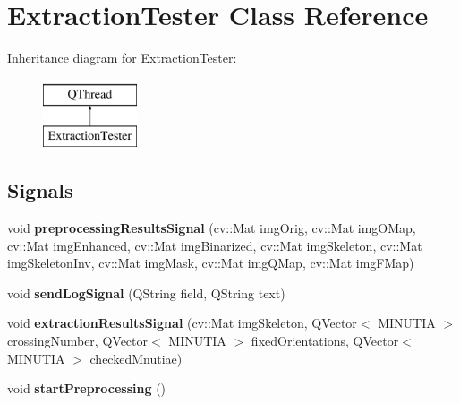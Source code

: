\hypertarget{class_extraction_tester}{}\section{Extraction\+Tester Class Reference}
\label{class_extraction_tester}
Inheritance diagram for Extraction\+Tester\+:\begin{figure}[H]
\begin{center}
\leavevmode
\includegraphics[height=2.000000cm]{class_extraction_tester}
\end{center}
\end{figure}
\subsection*{Signals}
\begin{DoxyCompactItemize}
\item 
\mbox{\label{class_extraction_tester_a7487d66988f68132722c3011ff06bdea}} 
void {\bfseries preprocessing\+Results\+Signal} (cv\+::\+Mat img\+Orig, cv\+::\+Mat img\+O\+Map, cv\+::\+Mat img\+Enhanced, cv\+::\+Mat img\+Binarized, cv\+::\+Mat img\+Skeleton, cv\+::\+Mat img\+Skeleton\+Inv, cv\+::\+Mat img\+Mask, cv\+::\+Mat img\+Q\+Map, cv\+::\+Mat img\+F\+Map)
\item 
\mbox{\label{class_extraction_tester_a8ef95fe9c357a88a10fb899471e48fcb}} 
void {\bfseries send\+Log\+Signal} (Q\+String field, Q\+String text)
\item 
\mbox{\label{class_extraction_tester_afa8a7e9e05078f0513377312828d95b8}} 
void {\bfseries extraction\+Results\+Signal} (cv\+::\+Mat img\+Skeleton, Q\+Vector$<$ M\+I\+N\+U\+T\+IA $>$ crossing\+Number, Q\+Vector$<$ M\+I\+N\+U\+T\+IA $>$ fixed\+Orientations, Q\+Vector$<$ M\+I\+N\+U\+T\+IA $>$ checked\+Mnutiae)
\item 
\mbox{\label{class_extraction_tester_a4f44cdfd3dbcee8adcb52e60676a4076}} 
void {\bfseries start\+Preprocessing} ()
\end{DoxyCompactItemize}
